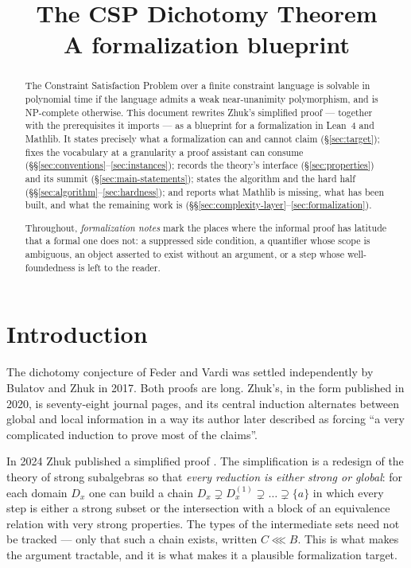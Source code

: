 \documentclass[11pt]{article}
\title{The CSP Dichotomy Theorem\\[2pt]
  \large A formalization blueprint}
\author{}\date{}
\begin{document}
\maketitle\vspace{-2.2em}
\begin{abstract}
The Constraint Satisfaction Problem over a finite constraint language is
solvable in polynomial time if the language admits a weak near-unanimity
polymorphism, and is \textup{NP}-complete otherwise. This document rewrites
Zhuk's simplified proof \cite{ZhukSimplified} --- together with the
prerequisites it imports --- as a blueprint for a formalization in Lean~4 and
Mathlib. It states precisely what a formalization can and cannot claim
(\S\ref{sec:target}); fixes the vocabulary at a granularity a proof assistant
can consume (\S\S\ref{sec:conventions}--\ref{sec:instances}); records the
theory's interface (\S\ref{sec:properties}) and its summit
(\S\ref{sec:main-statements}); states the algorithm and the hard half
(\S\S\ref{sec:algorithm}--\ref{sec:hardness}); and reports what Mathlib is
missing, what has been built, and what the remaining work is
(\S\S\ref{sec:complexity-layer}--\ref{sec:formalization}).

Throughout, \emph{formalization notes} mark the places where the informal proof
has latitude that a formal one does not: a suppressed side condition, a
quantifier whose scope is ambiguous, an object asserted to exist without an
argument, or a step whose well-foundedness is left to the reader.
\end{abstract}

\tableofcontents\clearpage

\section*{Introduction}

The dichotomy conjecture of Feder and Vardi \cite{FederVardi} was settled
independently by Bulatov \cite{Bulatov} and Zhuk \cite{ZhukJACM} in 2017. Both
proofs are long. Zhuk's, in the form published in 2020, is seventy-eight
journal pages, and its central induction alternates between global and local
information in a way its author later described as forcing ``a very complicated
induction to prove most of the claims''.

In 2024 Zhuk published a simplified proof \cite{ZhukSimplified}. The
simplification is a redesign of the theory of strong subalgebras so that
\emph{every reduction is either strong or global}: for each domain $D_{x}$ one
can build a chain
$D_{x}\supsetneq D_{x}^{(1)}\supsetneq\dots\supsetneq\{a\}$ in which every step
is either a strong subset or the intersection with a block of an equivalence
relation with very strong properties. The types of the intermediate sets need
not be tracked --- only that such a chain exists, written $C\lll B$. This is
what makes the argument tractable, and it is what makes it a plausible
formalization target.
\end{document}
